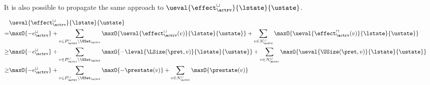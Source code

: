 It is also possible to propagate the same approach to $\ueval{\effect^\sqcup_\actrv}{\lstate}{\ustate}$.

\begin{equation} \label{eq:input_rv_reduction_lower}
  \begin{split}
  & \ueval{\effect^\sqcup_\actrv}{\lstate}{\ustate} \\
  = & \maxO{-e^{\sqcup}_\actrv}
    + \sum_{v \in P_\actrv^\sqcup \setminus \VSet_\actrv} \maxO{\ueval{\effect^\sqcup_\actrv(v)}{\lstate}{\ustate}}
    + \sum_{v \in N_\actrv^\sqcup} \maxO{\ueval{\effect^\sqcap_\actrv(v)}{\lstate}{\ustate}} \\
  \geq & \maxO{-e^{\sqcup}_\actrv}
    + \sum_{v \in P_\actrv^\sqcup \setminus \VSet_\actrv} \maxO{-\leval{\LSize(\pret, v)}{\lstate}{\ustate}}
    + \sum_{v \in N_\actrv^\sqcup} \maxO{\ueval{\USize(\pret, v)}{\lstate}{\ustate}} \\
  \geq & \maxO{-e^{\sqcup}_\actrv}
    + \sum_{v \in P_\actrv^\sqcup \setminus \VSet_\actrv} \maxO{-\prestate(v)}
    + \sum_{v \in N_\actrv^\sqcup} \maxO{\prestate(v)} \\
  \end{split}
\end{equation}

